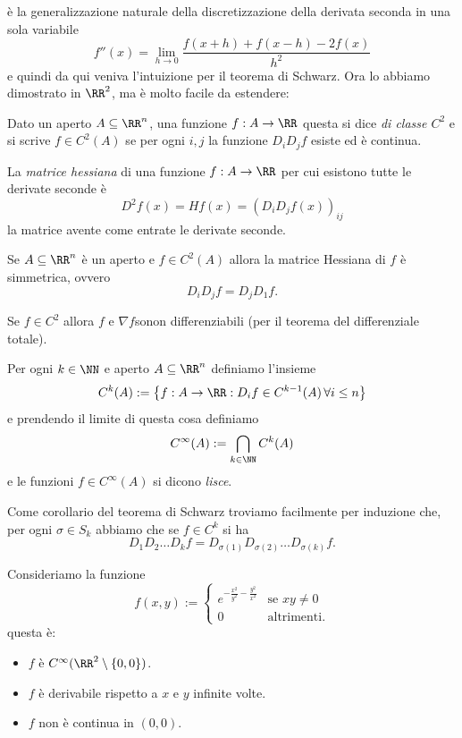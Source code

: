 \documentclass[11pt]{scrartcl}
\begin{document}
	è la generalizzazione naturale della discretizzazione della derivata seconda in una sola variabile
	$$f''(x)=\lim_{h\to 0}\frac{f(x+h)+f(x-h)-2f(x)}{h^2}$$
	e quindi da qui veniva l'intuizione per il teorema di Schwarz. Ora lo abbiamo dimostrato in $\RR^2$, ma è molto facile da estendere:
	\begin{definition}
		Dato un aperto $A\subseteq \RR^n$, una funzione $f:A\to\RR$ questa si dice \textit{di classe $C^2$} e si scrive $f\in C^2(A)$ se per ogni $i,j$ la funzione
		$D_iD_jf$ esiste ed è continua.
	\end{definition}
	\begin{definition}
		La \textit{matrice hessiana} di una funzione $f:A\to\RR$ per cui esistono tutte le derivate seconde è
		$$D^2f(x)=Hf(x)=\left(D_iD_j f(x)\right)_{ij}$$
		la matrice avente come entrate le derivate seconde. 
	\end{definition}
	\begin{theorem}
		Se $A\subseteq \RR^n$ è un aperto e $f\in C^2(A)$ allora la matrice Hessiana di $f$ è simmetrica, ovvero
		$$D_iD_jf=D_jD_1f.$$
	\end{theorem}
	\begin{remark}
		Se $f\in C^2$ allora $f$ e $\nabla f $sonon differenziabili (per il teorema del differenziale totale).
	\end{remark}
	\begin{definition}
		Per ogni $k\in \NN$ e aperto $A\subseteq\RR^n$ definiamo l'insieme 
		$$C^k(A):=\left\{f:A\to \RR:D_if\in C^{k-1}(A)\,\forall i\le n\right\}$$
		e prendendo il limite di questa cosa definiamo 
		$$C^\infty (A):=\bigcap_{k\in\NN}C^k(A)$$
		e le funzioni $f\in C^\infty(A)$ si dicono \textit{lisce}.
	\end{definition}
	Come corollario del teorema di Schwarz troviamo facilmente per induzione che, per ogni $\sigma\in S_k$ abbiamo che se $f\in C^k$ si ha
	$$D_1D_2\dots D_k f=D_{\sigma(1)}D_{\sigma(2)}\dots D_{\sigma(k)}f.$$
	\begin{example}
		Consideriamo la funzione
		$$f(x,y):=
		\begin{cases}
			e^{-\frac{x^2}{y^2}-\frac{y^2}{x^2}} & \text{se $xy\ne 0$}\\
			0 & \text{altrimenti.}
		\end{cases}
		$$
		questa è:
		\begin{itemize}
			\item $f$ è $C^\infty(\RR^2\setminus \left\{0,0\right\})$.
			\item $f$ è derivabile rispetto a $x$ e $y$ infinite volte.
			\item $f$ non è continua in $(0,0)$.
		\end{itemize}
	\end{example}
	
\end{document}
